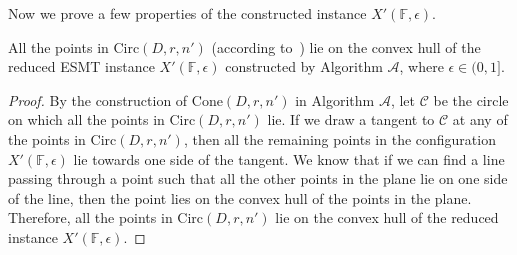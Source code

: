
Now we prove a few properties of the constructed instance $X'(\mathbb{F},\epsilon)$.
\begin{lemma}\label{lem:convhull_pts}
    All the points in $\mathrm{Circ}(D,r,n')$ (according to~) lie on the convex hull of the reduced ESMT instance $X'(\mathbb{F},\epsilon)$ constructed by Algorithm $\mathcal{A}$, where $\epsilon \in (0,1]$.
\end{lemma}

\begin{proof}
    By the construction of $\mathrm{Cone}(D,r,n')$ in Algorithm $\mathcal{A}$, let $\mathcal{C}$ be the circle on which all the points in $\mathrm{Circ}(D,r,n')$ lie. If we draw a tangent to $\mathcal{C}$ at any of the points in $\mathrm{Circ}(D,r,n')$, then all the remaining points in the configuration $X'(\mathbb{F},\epsilon)$ lie towards one side of the tangent. We know that if we can find a line passing through a point such that all the other points in the plane lie on one side of the line, then the point lies on the convex hull of the points in the plane. Therefore, all the points in $\mathrm{Circ}(D,r,n')$ lie on the convex hull of the reduced instance $X'(\mathbb{F},\epsilon)$.
\end{proof}

